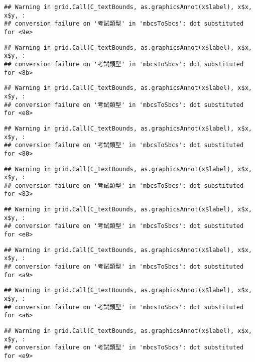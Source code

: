 \documentclass[
]{book}
\begin{document}
\begin{verbatim}
## Warning in grid.Call(C_textBounds, as.graphicsAnnot(x$label), x$x, x$y, :
## conversion failure on '考試類型' in 'mbcsToSbcs': dot substituted for <9e>
\end{verbatim}

\begin{verbatim}
## Warning in grid.Call(C_textBounds, as.graphicsAnnot(x$label), x$x, x$y, :
## conversion failure on '考試類型' in 'mbcsToSbcs': dot substituted for <8b>
\end{verbatim}

\begin{verbatim}
## Warning in grid.Call(C_textBounds, as.graphicsAnnot(x$label), x$x, x$y, :
## conversion failure on '考試類型' in 'mbcsToSbcs': dot substituted for <e8>
\end{verbatim}

\begin{verbatim}
## Warning in grid.Call(C_textBounds, as.graphicsAnnot(x$label), x$x, x$y, :
## conversion failure on '考試類型' in 'mbcsToSbcs': dot substituted for <80>
\end{verbatim}

\begin{verbatim}
## Warning in grid.Call(C_textBounds, as.graphicsAnnot(x$label), x$x, x$y, :
## conversion failure on '考試類型' in 'mbcsToSbcs': dot substituted for <83>
\end{verbatim}

\begin{verbatim}
## Warning in grid.Call(C_textBounds, as.graphicsAnnot(x$label), x$x, x$y, :
## conversion failure on '考試類型' in 'mbcsToSbcs': dot substituted for <e8>
\end{verbatim}

\begin{verbatim}
## Warning in grid.Call(C_textBounds, as.graphicsAnnot(x$label), x$x, x$y, :
## conversion failure on '考試類型' in 'mbcsToSbcs': dot substituted for <a9>
\end{verbatim}

\begin{verbatim}
## Warning in grid.Call(C_textBounds, as.graphicsAnnot(x$label), x$x, x$y, :
## conversion failure on '考試類型' in 'mbcsToSbcs': dot substituted for <a6>
\end{verbatim}

\begin{verbatim}
## Warning in grid.Call(C_textBounds, as.graphicsAnnot(x$label), x$x, x$y, :
## conversion failure on '考試類型' in 'mbcsToSbcs': dot substituted for <e9>
\end{verbatim}
\end{document}
